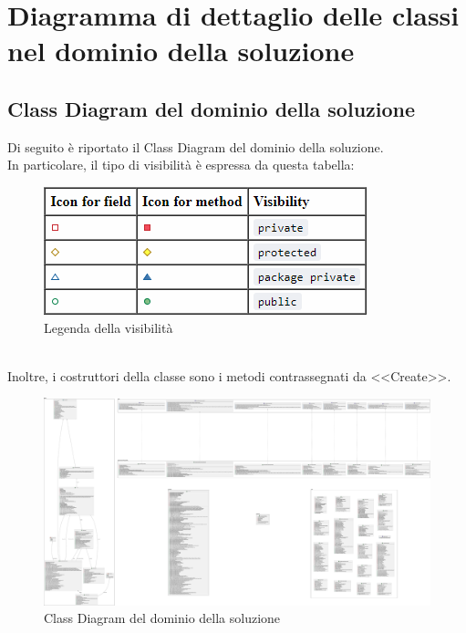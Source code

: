 \chapter{Diagramma di dettaglio delle classi nel dominio della soluzione}
    \section{Class Diagram del dominio della soluzione}
        Di seguito è riportato il Class Diagram del dominio della soluzione.\\
        In particolare, il tipo di visibilità è espressa da questa tabella:
        \begin{figure}[htbp!]
                \centering
                \includegraphics[width=0.25\linewidth]{Immagini/Legend visibility.png}
            \caption{Legenda della visibilità}
            \label{fig:Legenda della visibilità}
        \end{figure}\\
        Inoltre, i costruttori della classe sono i metodi contrassegnati da \textless{}\textless{}Create\textgreater{}\textgreater{}.

        \begin{figure}[htbp!]
            \centering
                \vspace{2\baselineskip}
                \includegraphics[width=\linewidth]{Immagini/Diagrammi/Class Diagram/Class Diagram del dominio della soluzione.pdf}
            \caption{Class Diagram del dominio della soluzione}
            \label{fig:Class Diagram del dominio della soluzione}
        \end{figure}